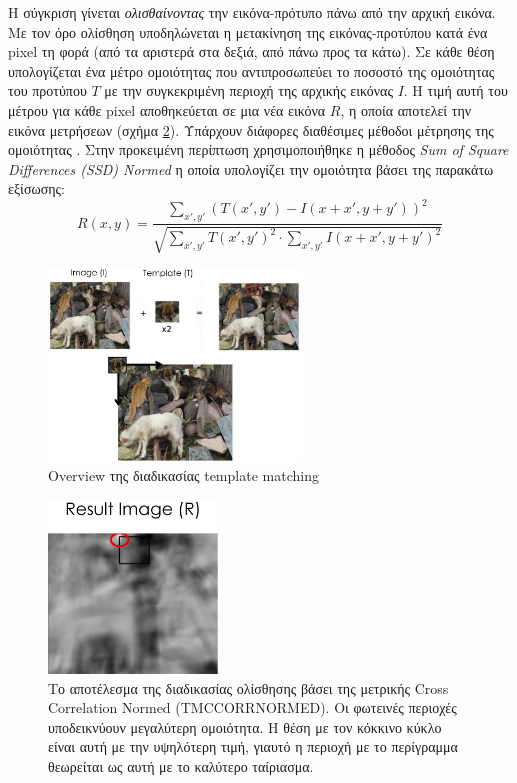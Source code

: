 Η σύγκριση γίνεται \emph{ολισθαίνοντας} την εικόνα-πρότυπο πάνω από την αρχική εικόνα. Με τον όρο ολίσθηση υποδηλώνεται η μετακίνηση της εικόνας-προτύπου κατά ένα pixel τη φορά (από τα αριστερά στα δεξιά, από πάνω προς τα κάτω). Σε κάθε θέση υπολογίζεται ένα μέτρο ομοιότητας που αντιπροσωπεύει το ποσοστό της ομοιότητας του προτύπου $T$ με την συγκεκριμένη περιοχή της αρχικής εικόνας $I$. Η τιμή αυτή του μέτρου για κάθε pixel αποθηκεύεται σε μια νέα εικόνα $R$, η οποία αποτελεί την εικόνα μετρήσεων (σχήμα \ref{fig:template-result}). Υπάρχουν διάφορες διαθέσιμες μέθοδοι μέτρησης της ομοιότητας \cite{Template98:online}. Στην προκειμένη περίπτωση χρησιμοποιήθηκε η μέθοδος \emph{Sum of Square Differences (SSD) Normed} η οποία υπολογίζει την ομοιότητα βάσει της παρακάτω εξίσωσης:\[R(x,y)=\frac{\sum_{x',y'}(T(x',y')-I(x+x',y+y'))^2}{\sqrt{\sum_{x',y'}T(x',y')^2\cdot \sum_{x',y'}I(x+x',y+y')^2}}\]
\begin{figure}[H]
    \centering
    \includegraphics[width=0.6\textwidth]{images/template_matching.png}
    \caption{Overview της διαδικασίας template matching}
    \label{fig:template-matching}
\end{figure}

\begin{figure}[H]
    \centering
    \includegraphics[width=0.4\textwidth]{images/template_result.png}
    \caption{Το αποτέλεσμα της διαδικασίας ολίσθησης βάσει της μετρικής Cross Correlation Normed (TM\textunderscore CCORR\textunderscore NORMED). Οι φωτεινές περιοχές υποδεικνύουν μεγαλύτερη ομοιότητα. Η θέση με τον κόκκινο κύκλο είναι αυτή με την υψηλότερη τιμή, γιαυτό η περιοχή με το περίγραμμα θεωρείται ως αυτή με το καλύτερο ταίριασμα.}
    \label{fig:template-result}
\end{figure}

